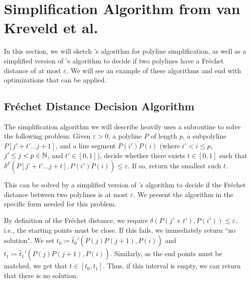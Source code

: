 \section{Simplification Algorithm from van Kreveld et al.}
\label{sec:algorithm_implementation}

In this section, we will sketch \citeauthor{on_optimal_polyline_simplification_using_the_hausdorff_and_frechet_distance}'s algorithm for polyline simplification, as well as a simplified version of \citeauthor{computing_the_frechet_distance_between_two_polygonal_curves}'s algorithm to decide if two polylines have a Fréchet distance of at most \(\varepsilon\). We will see an example of these algorithms and end with optimizations that can be applied.

\subsection{Fréchet Distance Decision Algorithm}
\label{ssec:alt_godau}
The simplification algorithm we will describe heavily uses a subroutine to solve the following problem: Given \(\varepsilon > 0\), a polyline \(P\) of length \(p\), a subpolyline \(P[j' + t' \dots j+1]\), and a line segment \(\overline{P(i')P(i)}\) (where \(i' < i \leq p\), \(j' \leq j < p\in \mathbb{N}\), and \(t' \in [0, 1]\)), decide whether there exists \(t \in [0, 1]\) such that \(\delta^F(P[j' + t' \dots j + t], \overline{P(i')P(i)}) \leq \varepsilon\). If so, return the smallest such \(t\).

This can be solved by a simplified version of \citeauthor{computing_the_frechet_distance_between_two_polygonal_curves}'s algorithm to decide if the Fréchet distance between two polylines is at most \(\varepsilon\). We present the algorithm in the specific form needed for this problem.

By definition of the Fréchet distance, we require \(\delta(P(j' + t'), P(i')) \leq \varepsilon\), i.e., the starting points must be close. If this fails, we immediately return ``no solution". We set \(t_0 \coloneq \hat t_0'(\overline{P(j)P(j+1)}, P(i))\) and \(t_1 \coloneq \hat t_1'(\overline{P(j)P(j+1)}, P(i))\). Similarly, as the end points must be matched, we get that \(t \in [t_0, t_1]\). Thus, if this interval is empty, we can return that there is no solution.


